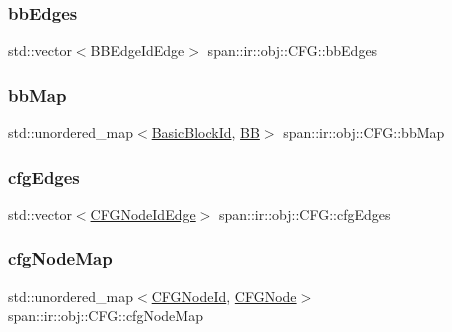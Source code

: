 \subsubsection{\texorpdfstring{bb\+Edges}{bbEdges}}
{\footnotesize\ttfamily std\+::vector$<$B\+B\+Edge\+Id\+Edge$>$ span\+::ir\+::obj\+::\+C\+F\+G\+::bb\+Edges\hspace{0.3cm}{\ttfamily [private]}}

\mbox{\label{classspan_1_1ir_1_1obj_1_1CFG_ab397d5c00efd9dd6a2ffeb545c16b71b}} 
\subsubsection{\texorpdfstring{bb\+Map}{bbMap}}
{\footnotesize\ttfamily std\+::unordered\+\_\+map$<$\hyperlink{namespacespan_ab988dafbd25ab39838239b91d6a86214}{Basic\+Block\+Id}, \hyperlink{classspan_1_1ir_1_1obj_1_1BB}{BB}$>$ span\+::ir\+::obj\+::\+C\+F\+G\+::bb\+Map\hspace{0.3cm}{\ttfamily [private]}}

\mbox{\label{classspan_1_1ir_1_1obj_1_1CFG_a2352d9b13704a1074df3c8b1553a4c31}} 
\subsubsection{\texorpdfstring{cfg\+Edges}{cfgEdges}}
{\footnotesize\ttfamily std\+::vector$<$\hyperlink{namespacespan_1_1ir_1_1obj_a8896662ab566cd79d401c0753d3c4120}{C\+F\+G\+Node\+Id\+Edge}$>$ span\+::ir\+::obj\+::\+C\+F\+G\+::cfg\+Edges\hspace{0.3cm}{\ttfamily [private]}}

\mbox{\label{classspan_1_1ir_1_1obj_1_1CFG_af11c6fd7a30810fbd49d9162a6b1d5da}} 
\subsubsection{\texorpdfstring{cfg\+Node\+Map}{cfgNodeMap}}
{\footnotesize\ttfamily std\+::unordered\+\_\+map$<$\hyperlink{namespacespan_a34e8d849ca2007fe03cb1817685d08bf}{C\+F\+G\+Node\+Id}, \hyperlink{classspan_1_1ir_1_1obj_1_1CFGNode}{C\+F\+G\+Node}$>$ span\+::ir\+::obj\+::\+C\+F\+G\+::cfg\+Node\+Map\hspace{0.3cm}{\ttfamily [private]}}

